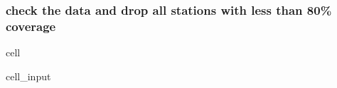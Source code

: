\documentclass[letterpaper,10pt,english]{jupyterBook}
\begin{document}
\subsubsection{check the data and drop all stations with less than 80\% coverage}
\label{\detokenize{notebooks/regional_and_local/SL_anomaly_intra-annual:check-the-data-and-drop-all-stations-with-less-than-80-coverage}}
\begin{sphinxuseclass}{cell}\begin{sphinxVerbatimInput}

\begin{sphinxuseclass}{cell_input}
\begin{sphinxVerbatim}[commandchars=\\\{\}]
  

  

\end{sphinxVerbatim}

\end{sphinxuseclass}\end{sphinxVerbatimInput}
\begin{sphinxVerbatimOutput}


\end{sphinxVerbatimOutput}
\end{sphinxuseclass}
\end{document}
